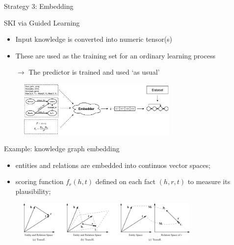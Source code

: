 \documentclass[presentation]{beamer}\mode<presentation>{\usetheme{AMSBolognaFC}}
\begin{document}
\begin{frame}[allowframebreaks]{Strategy 3: Embedding}
    
    \begin{block}{SKI via Guided Learning}
        \begin{itemize}
            \item Input knowledge is converted into numeric tensor(s)
            \item These are used as the training set for an ordinary learning process
            
            \medskip
            
            \item[$\rightarrow$] The predictor is trained and used `as usual'
        \end{itemize}
    \end{block}
    
    \begin{figure}
        \centering
        \includegraphics[width=0.7\textwidth]{figures/ski-embedding}
    \end{figure}
    
    \framebreak
    
    Example: \alert{knowledge graph embedding}
    \begin{itemize}
        \item \alert{entities} and \alert{relations} are embedded into continuos vector spaces;
        \item scoring function $f_{r}(h,t)$ defined on each fact $(h, r, t)$ to measure its plausibility;
    \end{itemize}
    \begin{figure}
        \centering
        \includegraphics[width=0.8\textwidth]{figures/kge-space.png}
    \end{figure}


\end{frame}
\end{document}
